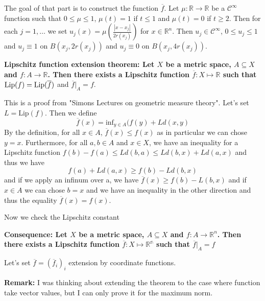 \documentclass{article}
\begin{document}
\vspace{1ex}
The goal of that part is to construct the function $\overline f$. Let $\mu:
\mathbb{R}\rightarrow\mathbb{R}$ be a $\mathcal{C}^\infty$ function such that
$0\leq\mu\leq1$, $\mu(t) = 1$ if $t\leq 1$ and $\mu(t)=0$ if $t\geq 2$. Then
for each $j=1,\ldots$ we set $u_j(x)=\mu\left(\frac{|x-x_j|}{2r(x_j)}\right)$
for $x\in\mathbb{R}^n$. Then $u_j\in\mathcal{C}^\infty$, $0\leq u_j\leq1$ and
$u_j\equiv 1$ on $B(x_j, 2r(x_j))$ and $u_j\equiv 0$ on $B(x_j, 4r(x_j))$. 

\vspace{1ex}
\textbf{Lipschitz function extension theorem: Let $X$ be a metric space,
$A\subseteq X$ and $f:A\rightarrow\mathbb{R}$. Then there exists a Lipschitz
function $\overline f:X\mapsto\mathbb{R}$ such that $\textnormal{Lip}(f)=\textnormal{Lip}
(\overline f)$} and $\overline f|_A=f$.

\vspace{1ex}
This is a proof from "Simons Lectures on geometric measure theory". Let's set
$L=\text{Lip}(f)$. Then we define
\[\overline f(x) = \text{inf}_{y\in A}(f(y)+Ld(x,y)\]
By the definition, for all $x\in A$, $\overline f(x)\leq f(x)$ as in particular
we can chose $y=x$.
Furthermore, for all $a,b\in A$ and $x\in X$, we have an inequality for a
Lipschitz function $f(b)-f(a)\leq Ld(b,a)\leq Ld(b,x)+Ld(a,x)$ and thus we have
\[ f(a)+Ld(a,x)\geq f(b)-Ld(b,x)\] 
and if we apply an infinum over a, we have $\overline f(x)\geq f(b)-L(b,x)$ and
if $x\in A$ we can chose $b=x$ and we have an inequality in the other direction
and thus the equality $\overline f(x)=f(x)$.

\vspace{1ex}
Now we check the Lipschitz constant
%

\vspace{1ex}
\textbf{Consequence: Let $X$ be a metric space, $A\subseteq X$ and
$f:A\rightarrow\mathbb{R}^n$. Then there exists a Lipschitz
function $\overline f:X\mapsto\mathbb{R^n}$ such that $\overline f|_A=f$}

\vspace{1ex}
Let's set $\overline f = (\overline f_i)_i$ extension by coordinate functions. 

\vspace{1ex}
\textbf{Remark:} I was thinking about extending the theorem to the case where
function take vector values, but I can only prove it for the maximum norm.
\end{document}
